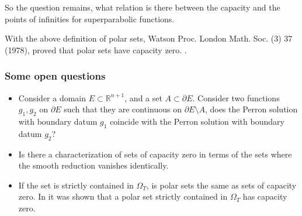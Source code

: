 \documentclass[reqno,a4paper,12pt]{amsart}
\theoremstyle{definition}
\numberwithin{theorem}{section} \numberwithin{equation}{section}
\newcommand{\R}{{\mathbb R}}
\begin{document}
So the question remains, what relation is there between the capacity and the points of infinities for superparabolic functions.

With the above definition of polar sets, Watson Proc. London Math. Soc. (3) 37 (1978), proved that polar sets have capacity zero. \cite{W}.

\subsubsection{Some open questions}
\begin{itemize}
	\item Consider a domain $E \subset \R^{n+1}$, and a set $A \subset \partial E$. Consider two functions $g_1,g_2$ on $\partial E$ such that they are continuous on $\partial E \setminus A$, does the Perron solution with boundary datum $g_1$ coincide with the Perron solution with boundary datum $g_2$?
	\item Is there a characterization of sets of capacity zero in terms of the sets where the smooth reduction vanishes identically.
	\item If the set is strictly contained in $\Omega_T$, is polar sets the same as sets of capacity zero. In \cite{KKKP} it was shown that a polar set strictly contained in $\Omega_T$ has capacity zero.
\end{itemize}
\end{document}
